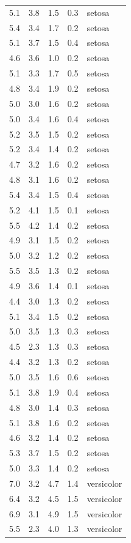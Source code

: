\documentclass[
  letterpaper,
  DIV=11,
  numbers=noendperiod,
  oneside]{scrreprt}
\begin{document}
\begin{longtable}[]{@{}rrrrl@{}}
5.1 & 3.8 & 1.5 & 0.3 & setosa \\
5.4 & 3.4 & 1.7 & 0.2 & setosa \\
5.1 & 3.7 & 1.5 & 0.4 & setosa \\
4.6 & 3.6 & 1.0 & 0.2 & setosa \\
5.1 & 3.3 & 1.7 & 0.5 & setosa \\
4.8 & 3.4 & 1.9 & 0.2 & setosa \\
5.0 & 3.0 & 1.6 & 0.2 & setosa \\
5.0 & 3.4 & 1.6 & 0.4 & setosa \\
5.2 & 3.5 & 1.5 & 0.2 & setosa \\
5.2 & 3.4 & 1.4 & 0.2 & setosa \\
4.7 & 3.2 & 1.6 & 0.2 & setosa \\
4.8 & 3.1 & 1.6 & 0.2 & setosa \\
5.4 & 3.4 & 1.5 & 0.4 & setosa \\
5.2 & 4.1 & 1.5 & 0.1 & setosa \\
5.5 & 4.2 & 1.4 & 0.2 & setosa \\
4.9 & 3.1 & 1.5 & 0.2 & setosa \\
5.0 & 3.2 & 1.2 & 0.2 & setosa \\
5.5 & 3.5 & 1.3 & 0.2 & setosa \\
4.9 & 3.6 & 1.4 & 0.1 & setosa \\
4.4 & 3.0 & 1.3 & 0.2 & setosa \\
5.1 & 3.4 & 1.5 & 0.2 & setosa \\
5.0 & 3.5 & 1.3 & 0.3 & setosa \\
4.5 & 2.3 & 1.3 & 0.3 & setosa \\
4.4 & 3.2 & 1.3 & 0.2 & setosa \\
5.0 & 3.5 & 1.6 & 0.6 & setosa \\
5.1 & 3.8 & 1.9 & 0.4 & setosa \\
4.8 & 3.0 & 1.4 & 0.3 & setosa \\
5.1 & 3.8 & 1.6 & 0.2 & setosa \\
4.6 & 3.2 & 1.4 & 0.2 & setosa \\
5.3 & 3.7 & 1.5 & 0.2 & setosa \\
5.0 & 3.3 & 1.4 & 0.2 & setosa \\
7.0 & 3.2 & 4.7 & 1.4 & versicolor \\
6.4 & 3.2 & 4.5 & 1.5 & versicolor \\
6.9 & 3.1 & 4.9 & 1.5 & versicolor \\
5.5 & 2.3 & 4.0 & 1.3 & versicolor \\

\end{longtable}
\end{document}
